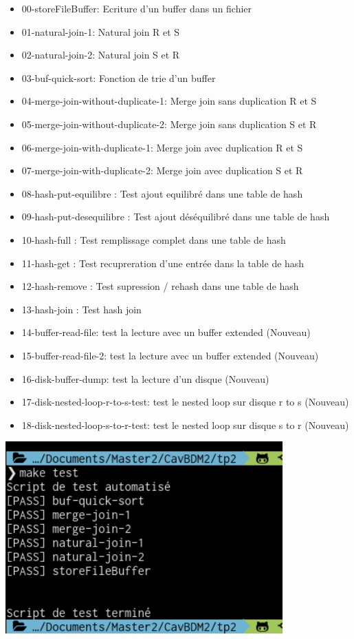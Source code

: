 \documentclass[a4paper]{article}
\begin{document}
\begin{itemize}
  \item 00-storeFileBuffer: Ecriture d'un buffer dans un fichier
  \item 01-natural-join-1: Natural join R et S
  \item 02-natural-join-2: Natural join S et R
  \item 03-buf-quick-sort: Fonction de trie d'un buffer
  \item 04-merge-join-without-duplicate-1: Merge join sans duplication R et S
  \item 05-merge-join-without-duplicate-2: Merge join sans duplication S et R
  \item 06-merge-join-with-duplicate-1: Merge join avec duplication R et S
  \item 07-merge-join-with-duplicate-2: Merge join avec duplication S et R
  \item 08-hash-put-equilibre : Test ajout equilibré dans une table de hash 
  \item 09-hash-put-desequilibre : Test ajout déséquilibré dans une table de hash 
  \item 10-hash-full : Test remplissage complet dans une table de hash
  \item 11-hash-get : Test recupreration d'une entrée dans la table de hash 
  \item 12-hash-remove : Test supression / rehash dans une table de hash 
  \item 13-hash-join : Test hash join 
  \item 14-buffer-read-file: test la lecture avec un buffer extended (Nouveau)
  \item 15-buffer-read-file-2: test la lecture avec un buffer extended  (Nouveau)
  \item 16-disk-buffer-dump: test la lecture d'un disque (Nouveau)
  \item 17-disk-nested-loop-r-to-s-test: test le nested loop sur disque r to s (Nouveau)
  \item 18-disk-nested-loop-s-to-r-test: test le nested loop sur disque s to r (Nouveau)
\end{itemize}

\includegraphics[width=0.8\textwidth]{test.png}
\end{document}
